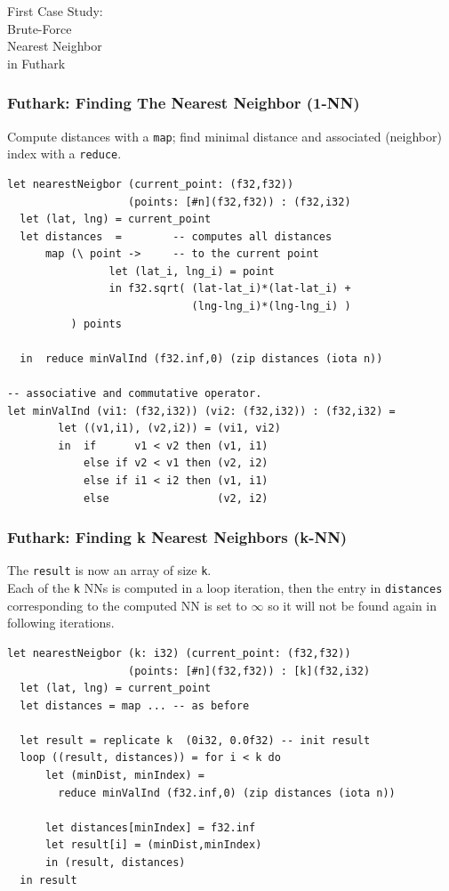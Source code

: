 \documentclass[rgb,dvipsnames]{beamer}
\renewcommand{\emph}[1]{\textcolor{structure}{#1}}
\begin{document}
\begin{frame}
  \begin{center}
    \Huge
    First Case Study:\\Brute-Force\\Nearest Neighbor\\in Futhark\\
  \end{center}
\end{frame}


\begin{frame}[fragile,t]
   \frametitle{Futhark: Finding The Nearest Neighbor (1-NN)}

Compute distances with a \emph{\tt map}; find minimal distance and 
associated (neighbor) index with a \emph{\tt reduce}.
\medskip

\begin{lstlisting}
let nearestNeigbor (current_point: (f32,f32)) 
                   (points: [#n](f32,f32)) : (f32,i32)
  let (lat, lng) = current_point
  let distances  =        -- computes all distances
      map (\ point ->     -- to the current point
                let (lat_i, lng_i) = point
                in f32.sqrt( (lat-lat_i)*(lat-lat_i) + 
                             (lng-lng_i)*(lng-lng_i) )
          ) points

  in  reduce minValInd (f32.inf,0) (zip distances (iota n))

-- associative and commutative operator.
let minValInd (vi1: (f32,i32)) (vi2: (f32,i32)) : (f32,i32) =
        let ((v1,i1), (v2,i2)) = (vi1, vi2)
        in  if      v1 < v2 then (v1, i1)
            else if v2 < v1 then (v2, i2)
            else if i1 < i2 then (v1, i1)
            else                 (v2, i2)
\end{lstlisting}

\end{frame}


\begin{frame}[fragile,t]
   \frametitle{Futhark: Finding k Nearest Neighbors (k-NN)}

The {\tt result} is now an array of size {\tt k}.\\
Each of the {\tt k} NNs is computed in a loop iteration, then the 
entry in {\tt distances} corresponding to the computed NN is set to 
$\infty$ so it will not be found again in following iterations. 
\medskip

\begin{lstlisting}
let nearestNeigbor (k: i32) (current_point: (f32,f32)) 
                   (points: [#n](f32,f32)) : [k](f32,i32)
  let (lat, lng) = current_point
  let distances = map ... -- as before

  let result = replicate k  (0i32, 0.0f32) -- init result
  loop ((result, distances)) = for i < k do
      let (minDist, minIndex) =
        reduce minValInd (f32.inf,0) (zip distances (iota n))

      let distances[minIndex] = f32.inf
      let result[i] = (minDist,minIndex)
      in (result, distances)
  in result
\end{lstlisting}

\end{frame}
\end{document}
